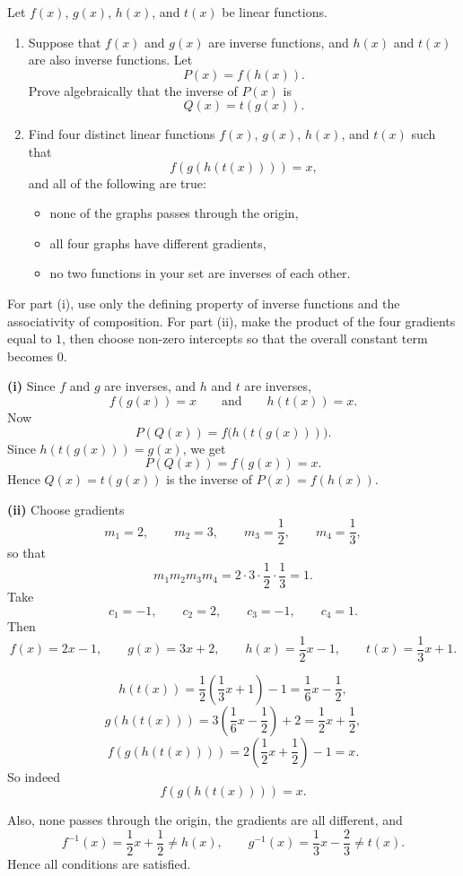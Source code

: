 \begin{problem}
Let $f(x)$, $g(x)$, $h(x)$, and $t(x)$ be linear functions.

\begin{enumerate}[label=(\roman*)]
\item Suppose that $f(x)$ and $g(x)$ are inverse functions, and $h(x)$ and $t(x)$ are also inverse functions. Let
\[
P(x)=f(h(x)).
\]
Prove algebraically that the inverse of $P(x)$ is
\[
Q(x)=t(g(x)).
\]
\item Find four distinct linear functions $f(x)$, $g(x)$, $h(x)$, and $t(x)$ such that
\[
f(g(h(t(x))))=x,
\]
and all of the following are true:
\begin{itemize}[leftmargin=*]
\item none of the graphs passes through the origin,
\item all four graphs have different gradients,
\item no two functions in your set are inverses of each other.
\end{itemize}
\end{enumerate}
\end{problem}

\begin{hint}
For part (i), use only the defining property of inverse functions and the associativity of composition. For part (ii), make the product of the four gradients equal to $1$, then choose non-zero intercepts so that the overall constant term becomes $0$.
\end{hint}

\begin{solution}
\textbf{(i)} Since $f$ and $g$ are inverses, and $h$ and $t$ are inverses,
\[
f(g(x))=x
\qquad \text{and} \qquad
h(t(x))=x.
\]
Now
\[
P(Q(x))=f\bigl(h(t(g(x)))\bigr).
\]
Since $h(t(g(x)))=g(x)$, we get
\[
P(Q(x))=f(g(x))=x.
\]
Hence $Q(x)=t(g(x))$ is the inverse of $P(x)=f(h(x))$.

\textbf{(ii)} Choose gradients
\[
m_1=2,\qquad m_2=3,\qquad m_3=\frac12,\qquad m_4=\frac13,
\]
so that
\[
m_1m_2m_3m_4=2\cdot 3\cdot \frac12\cdot \frac13=1.
\]
Take
\[
c_1=-1,\qquad c_2=2,\qquad c_3=-1,\qquad c_4=1.
\]
Then
\[
f(x)=2x-1,\qquad g(x)=3x+2,\qquad h(x)=\frac12x-1,\qquad t(x)=\frac13x+1.
\]

\[
h(t(x))=\frac12\left(\frac13x+1\right)-1=\frac16x-\frac12,
\]
\[
g(h(t(x)))=3\left(\frac16x-\frac12\right)+2=\frac12x+\frac12,
\]
\[
f(g(h(t(x))))=2\left(\frac12x+\frac12\right)-1=x.
\]
So indeed
\[
\boxed{f(g(h(t(x))))=x.}
\]

Also, none passes through the origin, the gradients are all different, and
\[
f^{-1}(x)=\frac12x+\frac12\ne h(x),\qquad
g^{-1}(x)=\frac13x-\frac23\ne t(x).
\]
Hence all conditions are satisfied.
\end{solution}

